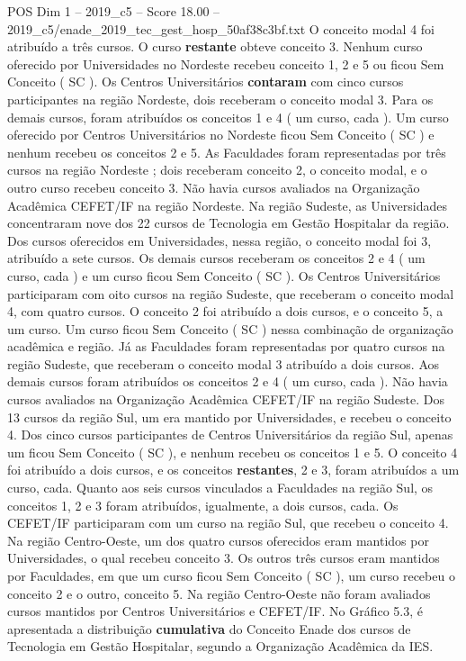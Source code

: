 \begin{textsample}{POS Dim 1 – 2019\_c5 – Score 18.00 – 2019\_c5/enade\_2019\_tec\_gest\_hosp\_50af38c3bf.txt}
O conceito modal 4 foi atribuído a três cursos.
O curso \textbf{restante} obteve conceito 3.
Nenhum curso oferecido por Universidades no Nordeste recebeu conceito 1, 2 e 5 ou ficou Sem Conceito ( SC ).
Os Centros Universitários \textbf{contaram} com cinco cursos participantes na região Nordeste, dois receberam o conceito modal 3.
Para os demais cursos, foram atribuídos os conceitos 1 e 4 ( um curso, cada ).
Um curso oferecido por Centros Universitários no Nordeste ficou Sem Conceito ( SC ) e nenhum recebeu os conceitos 2 e 5.
As Faculdades foram representadas por três cursos na região Nordeste ; dois receberam conceito 2, o conceito modal, e o outro curso recebeu conceito 3.
Não havia cursos avaliados na Organização Acadêmica CEFET/IF na região Nordeste.
Na região Sudeste, as Universidades concentraram nove dos 22 cursos de Tecnologia em Gestão Hospitalar da região.
Dos cursos oferecidos em Universidades, nessa região, o conceito modal foi 3, atribuído a sete cursos.
Os demais cursos receberam os conceitos 2 e 4 ( um curso, cada ) e um curso ficou Sem Conceito ( SC ).
Os Centros Universitários participaram com oito cursos na região Sudeste, que receberam o conceito modal 4, com quatro cursos.
O conceito 2 foi atribuído a dois cursos, e o conceito 5, a um curso.
Um curso ficou Sem Conceito ( SC ) nessa combinação de organização acadêmica e região.
Já as Faculdades foram representadas por quatro cursos na região Sudeste, que receberam o conceito modal 3 atribuído a dois cursos.
Aos demais cursos foram atribuídos os conceitos 2 e 4 ( um curso, cada ).
Não havia cursos avaliados na Organização Acadêmica CEFET/IF na região Sudeste.
Dos 13 cursos da região Sul, um era mantido por Universidades, e recebeu o conceito 4.
Dos cinco cursos participantes de Centros Universitários da região Sul, apenas um ficou Sem Conceito ( SC ), e nenhum recebeu os conceitos 1 e 5.
O conceito 4 foi atribuído a dois cursos, e os conceitos \textbf{restantes}, 2 e 3, foram atribuídos a um curso, cada.
Quanto aos seis cursos vinculados a Faculdades na região Sul, os conceitos 1, 2 e 3 foram atribuídos, igualmente, a dois cursos, cada.
Os CEFET/IF participaram com um curso na região Sul, que recebeu o conceito 4.
Na região Centro-Oeste, um dos quatro cursos oferecidos eram mantidos por Universidades, o qual recebeu conceito 3.
Os outros três cursos eram mantidos por Faculdades, em que um curso ficou Sem Conceito ( SC ), um curso recebeu o conceito 2 e o outro, conceito 5.
Na região Centro-Oeste não foram avaliados cursos mantidos por Centros Universitários e CEFET/IF.
No Gráfico 5.3, é apresentada a distribuição \textbf{cumulativa} do Conceito Enade dos cursos de Tecnologia em Gestão Hospitalar, segundo a Organização Acadêmica da IES.

\end{textsample}
